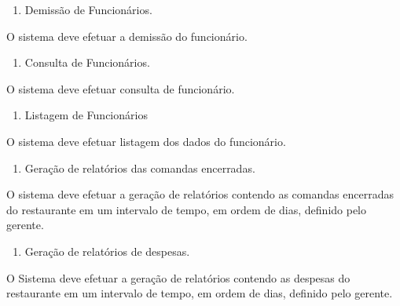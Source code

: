 \liststyleWWNumi
\setcounter{saveenum}{\value{enumi}}
\begin{enumerate}
\setcounter{enumi}{\value{saveenum}}
\item {
\textcolor[rgb]{0.078431375,0.09411765,0.13725491}{Demissão de Funcionários.}}
\end{enumerate}
{
\textcolor[rgb]{0.078431375,0.09411765,0.13725491}{O sistema deve efetuar a demissão do funcionário.}}

\liststyleWWNumi
\setcounter{saveenum}{\value{enumi}}
\begin{enumerate}
\setcounter{enumi}{\value{saveenum}}
\item {
\textcolor[rgb]{0.078431375,0.09411765,0.13725491}{Consulta de Funcionários.}}
\end{enumerate}
{
\textcolor[rgb]{0.078431375,0.09411765,0.13725491}{O sistema deve efetuar consulta de funcionário.}}

\liststyleWWNumi
\setcounter{saveenum}{\value{enumi}}
\begin{enumerate}
\setcounter{enumi}{\value{saveenum}}
\item {
\textcolor[rgb]{0.078431375,0.09411765,0.13725491}{Listagem de Funcionários}}
\end{enumerate}
{
\textcolor[rgb]{0.078431375,0.09411765,0.13725491}{O sistema deve efetuar listagem dos dados do funcionário.}}


\bigskip


\bigskip

\liststyleWWNumi
\setcounter{saveenum}{\value{enumi}}
\begin{enumerate}
\setcounter{enumi}{\value{saveenum}}
\item {
\textcolor[rgb]{0.078431375,0.09411765,0.13725491}{Geração de relatórios das comandas encerradas.}}
\end{enumerate}
{
\textcolor[rgb]{0.078431375,0.09411765,0.13725491}{O sistema deve efetuar a geração de relatórios contendo as comandas
encerradas do restaurante em um intervalo de tempo, em ordem de dias, definido pelo gerente.}}

\liststyleWWNumi
\setcounter{saveenum}{\value{enumi}}
\begin{enumerate}
\setcounter{enumi}{\value{saveenum}}
\item {
\textcolor[rgb]{0.078431375,0.09411765,0.13725491}{Geração de relatórios de despesas.}}
\end{enumerate}
{
\textcolor[rgb]{0.078431375,0.09411765,0.13725491}{O Sistema deve efetuar a geração de relatórios contendo as despesas
do restaurante em um intervalo de tempo, em ordem de dias, definido pelo gerente.}}

